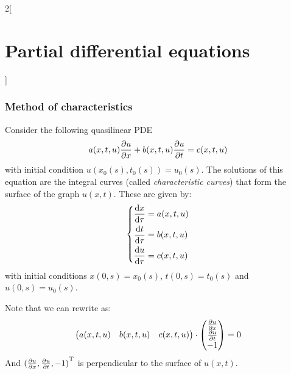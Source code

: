 \documentclass[../../../main_math.tex]{subfiles}
\begin{document}
\begin{multicols}{2}[\section{Partial differential equations}]
  \subsubsection{Method of characteristics}
  \begin{proposition}
    Consider the following quasilinear PDE
    \begin{equation}\label{PDE:char}
      a(x,t,u)\pdv{u}{x}+b(x,t,u)\pdv{u}{t}=c(x,t,u)
    \end{equation}
    with initial condition $u(x_0(s),t_0(s))=u_0(s)$. The solutions of this equation are the integral curves (called \emph{characteristic curves}) that form the surface of the graph $u(x,t)$. These are given by:
    \begin{equation*}
      \left\{
      \begin{aligned}
        \dv{x}{\tau} & = a(x,t,u) \\
        \dv{t}{\tau} & = b(x,t,u) \\
        \dv{u}{\tau} & = c(x,t,u) \\
      \end{aligned}
      \right.
    \end{equation*}
    with initial conditions $x(0,s)=x_0(s)$, $t(0,s)=t_0(s)$ and $u(0,s)=u_0(s)$.
  \end{proposition}
  \begin{sproof}
    Note that we can rewrite  as: $$\begin{pmatrix}
        a(x,t,u) & b(x,t,u) & c(x,t,u)
      \end{pmatrix}\cdot\begin{pmatrix}
        \pdv{u}{x} \\
        \pdv{u}{t} \\
        -1
      \end{pmatrix}=0$$
    And ${(\pdv{u}{x},\pdv{u}{t}, -1)}^{\mathrm{T}}$ is perpendicular to the surface of $u(x,t)$.
  \end{sproof}

\end{multicols}
\end{document}

